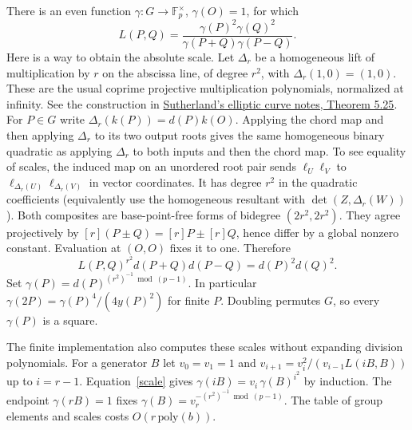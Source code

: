 \documentclass[11pt]{article}
\newcommand{\F}{\mathbb F}
\begin{document}
There is an even function $\gamma:G\to\F_p^\times$, $\gamma(O)=1$,
for which
\begin{equation}
 L(P,Q)=\frac{\gamma(P)^2\gamma(Q)^2}{\gamma(P+Q)\gamma(P-Q)}.
 \label{scale}
\end{equation}
Here is a way to obtain the absolute scale. Let $\Delta_r$ be a
homogeneous lift of multiplication by $r$ on the abscissa line, of
degree $r^2$, with $\Delta_r(1,0)=(1,0)$. These are the usual
coprime projective multiplication polynomials, normalized at infinity.
See the construction in
\href{https://ocw.mit.edu/courses/18-783-elliptic-curves-fall-2025/mit18_783_f25_lec_full.pdf}
{Sutherland's elliptic curve notes, Theorem 5.25}.
For $P\in G$ write $\Delta_r(k(P))=d(P)k(O)$.
Applying the chord map and then applying $\Delta_r$ to its two
output roots gives the same homogeneous binary quadratic as applying
$\Delta_r$ to both inputs and then the chord map. To see equality of
scales, the induced map on an unordered root pair sends
$\ell_U\ell_V$ to $\ell_{\Delta_r(U)}\ell_{\Delta_r(V)}$ in vector
coordinates. It has degree $r^2$ in the quadratic coefficients
(equivalently use the homogeneous resultant with
$\det(Z,\Delta_r(W))$). Both composites are base-point-free forms
of bidegree $(2r^2,2r^2)$. They agree projectively by
$[r](P\pm Q)=[r]P\pm[r]Q$, hence differ by a global nonzero
constant. Evaluation at $(O,O)$ fixes it to one. Therefore
\[
 L(P,Q)^{r^2}d(P+Q)d(P-Q)=d(P)^2d(Q)^2.
\]
Set $\gamma(P)=d(P)^{(r^2)^{-1}\bmod(p-1)}$.
In particular $\gamma(2P)=\gamma(P)^4/(4y(P)^2)$ for finite $P$.
Doubling permutes $G$, so every $\gamma(P)$ is a square.

The finite implementation also computes these scales without expanding
division polynomials. For a generator $B$ let $v_0=v_1=1$ and
$v_{i+1}=v_i^2/(v_{i-1}L(iB,B))$ up to $i=r-1$.
Equation~\eqref{scale} gives
$\gamma(iB)=v_i\,\gamma(B)^{i^2}$ by induction. The endpoint
$\gamma(rB)=1$ fixes $\gamma(B)=v_r^{-(r^2)^{-1}\bmod(p-1)}$.
The table of group elements and scales costs $O(r\,\mathrm{poly}(b))$.
\end{document}
